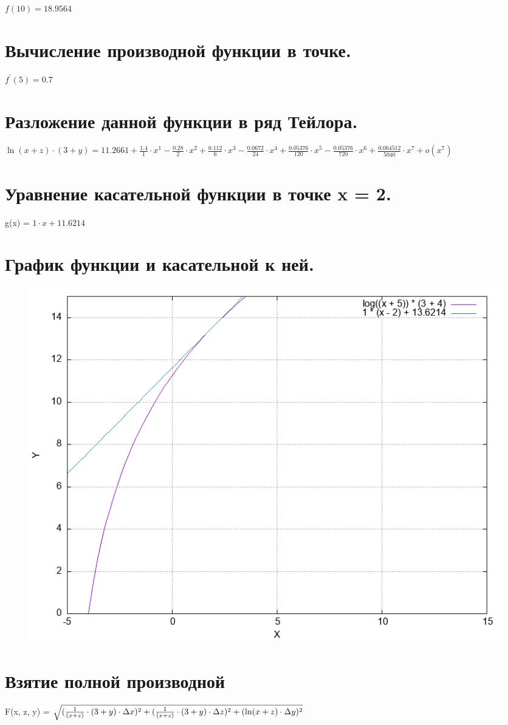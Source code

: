 \documentclass{article}
\begin{document}
$ f(10) = 18.9564 $
\section{Вычисление производной функции в точке.}

$ f^{'}(5) = 0.7 $
\section{Разложение данной функции в ряд Тейлора.}

$\ln(x + z) \cdot (3 + y) =  11.2661 + \frac{1.4}{1}\cdot x^1 - \frac{0.28}{2}\cdot x^2 + \frac{0.112}{6}\cdot x^3 - \frac{0.0672}{24}\cdot x^4 + \frac{0.05376}{120}\cdot x^5 - \frac{0.05376}{720}\cdot x^6 + \frac{0.064512}{5040}\cdot x^7 + o(x^7) $
\section{Уравнение касательной функции в точке x = 2.}

g(x) = $1 \cdot x + 11.6214 $
\section{График функции и касательной к ней.}


\begin{figure}[ht]
\center
\includegraphics[scale=0.65]{graph.png}
\end{figure}

\section{Взятие полной производной}

F(x, z, y) = $ \sqrt{({1 \over (x + z)} \cdot (3 + y) \cdot \Delta x)^2 + ({1 \over (x + z)} \cdot (3 + y) \cdot \Delta z)^2 + (\ln(x + z) \cdot \Delta y)^2} $
\end{document}

